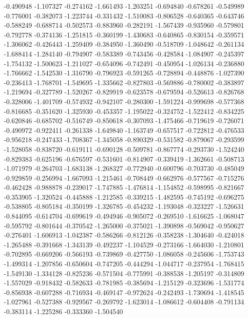 -0.490948
-1.107327
-0.274162
-1.661493
-1.203251
-0.694840
-0.678261
-0.549989
-0.776001
-0.382073
-1.223744
-0.331432
-1.510083
-0.806528
-0.640365
-0.643746
-0.588249
-0.688714
-0.502573
-0.883960
-0.282191
-1.567439
-0.935960
-0.579801
-0.792778
-0.374136
-1.251815
-0.360199
-1.430683
-0.640865
-0.830154
-0.359571
-1.306062
-0.426443
-1.259409
-0.384950
-1.360490
-0.518709
-1.048642
-0.261134
-1.688414
-1.284140
-0.794907
-0.583389
-0.743456
-0.428584
-1.084907
-0.245397
-1.754132
-1.500623
-1.211027
-0.654096
-0.742491
-0.450954
-1.026134
-0.236880
-1.766662
-1.542530
-1.316790
-0.796923
-0.591265
-0.728894
-0.448876
-1.027390
-0.236413
-1.768701
-1.549695
-1.335662
-0.827803
-0.569886
-0.780002
-0.383897
-1.219694
-0.327789
-1.520267
-0.829919
-0.623578
-0.679594
-0.526613
-0.826768
-0.328006
-1.401709
-0.574932
-0.942107
-0.280300
-1.591224
-0.999698
-0.577368
-0.816685
-0.351620
-1.325930
-0.453357
-1.195022
-0.324752
-1.522412
-0.834225
-0.620846
-0.685702
-0.516749
-0.850618
-0.307093
-1.475466
-0.719619
-0.726071
-0.490972
-0.922411
-0.261338
-1.649840
-1.163749
-0.657517
-0.722812
-0.476533
-0.956218
-0.247433
-1.708367
-1.345058
-0.890329
-0.531582
-0.879067
-0.293599
-1.528058
-0.838720
-0.619111
-0.690128
-0.509781
-0.867774
-0.293730
-1.524240
-0.829383
-0.625196
-0.676597
-0.531601
-0.814907
-0.339419
-1.362661
-0.508713
-1.071979
-0.264703
-1.683138
-1.268327
-0.772940
-0.600796
-0.703730
-0.485049
-0.929859
-0.256994
-1.667093
-1.215461
-0.708449
-0.662976
-0.577567
-0.715276
-0.462428
-0.988878
-0.239017
-1.747885
-1.476814
-1.154852
-0.598995
-0.821667
-0.353905
-1.320524
-0.445888
-1.212585
-0.339215
-1.482595
-0.745192
-0.696275
-0.538805
-0.805184
-0.350199
-1.326785
-0.454232
-1.193048
-0.323227
-1.526631
-0.844095
-0.614704
-0.699619
-0.494946
-0.905072
-0.269510
-1.616625
-1.068047
-0.595792
-0.801644
-0.370542
-1.265000
-0.375021
-1.390898
-0.569042
-0.950627
-0.276401
-1.606913
-1.042387
-0.586266
-0.812126
-0.358238
-1.304640
-0.424018
-1.265488
-0.391668
-1.343139
-0.492237
-1.104529
-0.273166
-1.664030
-1.210801
-0.702895
-0.669206
-0.566193
-0.739869
-0.427750
-1.086058
-0.245606
-1.753743
-1.499314
-1.207856
-0.650604
-0.747205
-0.444294
-1.044717
-0.237954
-1.768415
-1.549130
-1.334128
-0.825236
-0.571504
-0.775991
-0.388538
-1.205197
-0.314809
-1.557029
-0.918432
-0.582633
-0.781985
-0.385694
-1.215129
-0.323696
-1.531774
-0.856938
-0.607288
-0.716934
-0.469147
-0.972624
-0.242493
-1.730694
-1.418545
-1.027961
-0.527388
-0.929567
-0.269792
-1.623014
-1.086612
-0.604408
-0.791134
-0.383114
-1.225286
-0.333360
-1.504540
